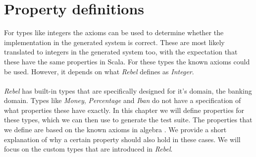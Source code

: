 \chapter{Property definitions} 
\label{cpt:4_properties}



For types like integers the axioms can be used to determine whether the implementation in the generated system is correct. These are most likely translated to integers in the generated system too, with the expectation that these have the same properties in Scala. For these types the known axioms could be used. However, it depends on what \textit{Rebel} defines as \textit{Integer}.\\
\\
\textit{Rebel} has built-in types that are specifically designed for it's domain, the banking domain. Types like \textit{Money}, \textit{Percentage} and \textit{Iban} do not have a specification of what properties these have exactly. In this chapter we will define properties for these types, which we can then use to generate the test suite. The properties that we define are based on the known axioms in algebra \cite{baumgart1961axioms,raftery2011perspective,apostol2007calculus}. We provide a short explanation of why a certain property should also hold in these cases. We will focus on the custom types that are introduced in \textit{Rebel}.

